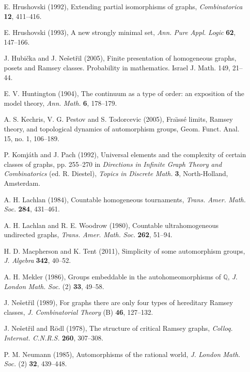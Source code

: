 \documentclass{book}
\begin{document}
\begin{thebibliography}{99}
E. Hrushovski (1992),
Extending partial isomorphisms of graphs,
\textit{Combinatorica} \textbf{12}, 411--416.

E. Hrushovski (1993),
A new strongly minimal set,
\textit{Ann. Pure Appl. Logic} \textbf{62}, 147--166.

J. Hubi\v{c}ka and J. Ne\v{s}et\v{r}il (2005),
Finite presentation of homogeneous graphs, posets and Ramsey classes.
Probability in mathematics. Israel J. Math. 149, 21--44.

E. V. Huntington (1904),
The continuum as a type of order: an exposition of the model theory,
\textit{Ann. Math.} \textbf{6}, 178--179.

A. S. Kechris, V. G. Pestov and S. Todorcevic (2005),
Fra\"{\i}ss\'e limits, Ramsey theory, and topological dynamics of
automorphism groups,
Geom. Funct. Anal. 15, no. 1, 106--189.

P. Komj\'{a}th and J. Pach (1992),
Universal elements and the complexity of certain classes of graphs,
pp. 255--270 in \textit{Directions in Infinite Graph Theory and Combinatorics}
(ed. R. Diestel),
\textit{Topics in Discrete Math.} \textbf{3}, North-Holland, Amsterdam.

A. H. Lachlan (1984),
Countable homogeneous tournaments,
\textit{Trans. Amer. Math. Soc.} \textbf{284}, 431--461.

A. H. Lachlan and R. E. Woodrow (1980),
Countable ultrahomogeneous undirected graphs,
\textit{Trans. Amer. Math. Soc.} \textbf{262}, 51--94.

H. D. Macpherson and K. Tent (2011), 
Simplicity of some automorphism groups,
\textit{J. Algebra} \textbf{342}, 40--52.

A. H. Mekler (1986),
Groups embeddable in the autohomeomorphisms of $\mathbb{Q}$,
\textit{J. London Math. Soc.} (2) \textbf{33}, 49--58.

J. Ne\v{s}et\v{r}il (1989),
For graphs there are only four types of hereditary Ramsey classes,
\textit{J. Combinatorial Theory} (B) \textbf{46}, 127--132.

J. Ne\v{s}et\v{r}il and R\"{o}dl (1978),
The structure of critical Ramsey graphs,
\textit{Colloq. Internat. C.N.R.S.} \textbf{260}, 307--308.

P. M. Neumann (1985),
Automorphisms of the rational world,
\textit{J. London Math. Soc.} (2) \textbf{32}, 439--448.


\end{thebibliography}
\end{document}
